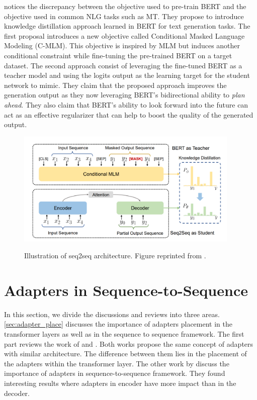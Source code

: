  notices the discrepancy between the objective used to pre-train BERT and the objective used in common NLG tasks such as MT. They propose to introduce knowledge distillation approach learned in BERT for text generation tasks. The first proposal introduces a new objective called Conditional Masked Language Modeling (C-MLM). This objective is inspired by MLM but induces another conditional constraint while fine-tuning the pre-trained BERT on a target dataset. The second approach consist of leveraging the fine-tuned BERT as a teacher model and using the logits output as the learning target for the student network to mimic. They claim that the proposed approach improves the generation output as they now leveraging BERT's bidirectional ability to \textit{plan ahead}. They also claim that BERT's ability to look forward into the future can act as an effective regularizer that can help to boost the quality of the generated output.

\begin{figure}[h]
    {\includegraphics[width=0.95\textwidth]{img/bert_distill.png}}
    \centering
    \caption{Illustration of seq2seq architecture. Figure reprinted from .}
    \label{img:bert_distill}
\end{figure}

\section{Adapters in Sequence-to-Sequence}
\label{sec:adapter_seq}

In this section, we divide the discussions and reviews into three areas. \cref{sec:adapter_place} discusses the importance of adapters placement in the transformer layers as well as in the sequence to sequence framework. The first part reviews the work of  and . Both works propose the same concept of adapters with similar architecture. The difference between them lies in the placement of the adapters within the transformer layer. The other work by  discuss the importance of adapters in sequence-to-sequence framework. They found interesting results where adapters in encoder have more impact than in the decoder.

